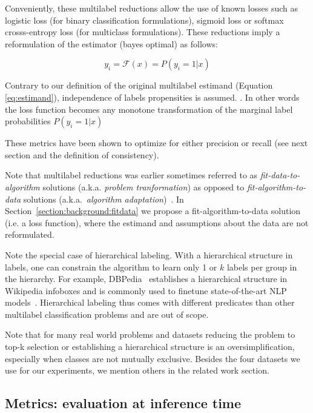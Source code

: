 Conveniently, these multilabel reductions allow the use of known losses such as logistic loss (for binary classification formulations), sigmoid loss or softmax crosss-entropy loss (for multiclass formulations). These reductions imply a reformulation of the estimator (bayes optimal) as follows:

\begin{equation}
  y_i = \mathcal{F}(x) = P(y_i = 1 | x)
\end{equation}

Contrary to our definition of the original multilabel estimand (Equation \ref{eq:estimand}), independence of labels propensities is assumed. . In other words the loss function becomes any monotone transformation of the marginal label probabilities $ P(y_i = 1 | x)$ ~\cite{OVA2, multilabelMetrics, unifiedView}

These metrics have been shown to optimize for either precision or recall (see next section and the definition of consistency).


Note that multilabel reductions was earlier sometimes referred to as \emph{fit-data-to-algorithm} solutions (a.k.a. \emph{problem tranformation}) as opposed to \emph{fit-algorithm-to-data} solutions (a.k.a.\ \emph{algorithm adaptation})~\cite{multilabelReview, multilabelReview2}. In Section~\ref{section:background:fitdata} we propose a fit-algorithm-to-data solution (i.e. a loss function), where the estimand and assumptions about the data are not reformulated.

Note the special case of hierarchical labeling. With a hierarchical structure in labels, one can constrain the algorithm to learn only 1 or $k$ labels per group in the hierarchy. For example, DBPedia~\citep{lehmann2015dbpedia} establishes a hierarchical structure in Wikipedia infoboxes and is commonly used to finetune state-of-the-art NLP models~\citep[see, e.g.,][]{XLNet, ULMFit}. Hierarchical labeling thus comes with different predicates than other multilabel classification problems and are out of scope.

Note that for many real world problems and datasets reducing the problem to top-k selection or establishing a hierarchical structure is an oversimplification, especially when classes are not mutually exclusive. Besides the four datasets we use for our experiments, we mention others in the related work section.

\subsection{Metrics: evaluation at inference time}
\label{section:background:metrics}

